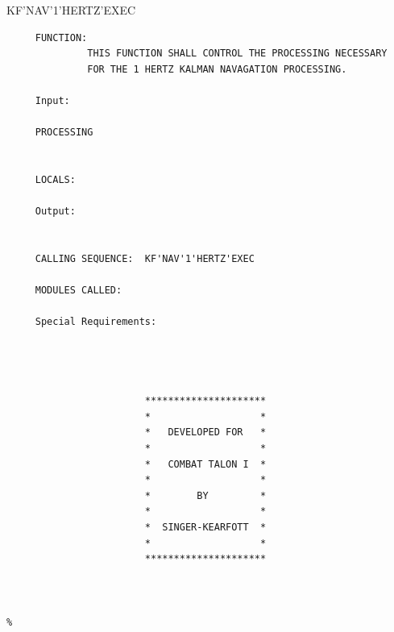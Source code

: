 \begin{frame}
KF'NAV'1'HERTZ'EXEC
\begin{verbatim}
     FUNCTION:
              THIS FUNCTION SHALL CONTROL THE PROCESSING NECESSARY
              FOR THE 1 HERTZ KALMAN NAVAGATION PROCESSING.

     Input:

     PROCESSING


     LOCALS:

     Output:


     CALLING SEQUENCE:  KF'NAV'1'HERTZ'EXEC

     MODULES CALLED:

     Special Requirements:




                        *********************
                        *                   *
                        *   DEVELOPED FOR   *
                        *                   *
                        *   COMBAT TALON I  *
                        *                   *
                        *        BY         *
                        *                   *
                        *  SINGER-KEARFOTT  *
                        *                   *
                        *********************



%
\end{verbatim}
\end{frame}
